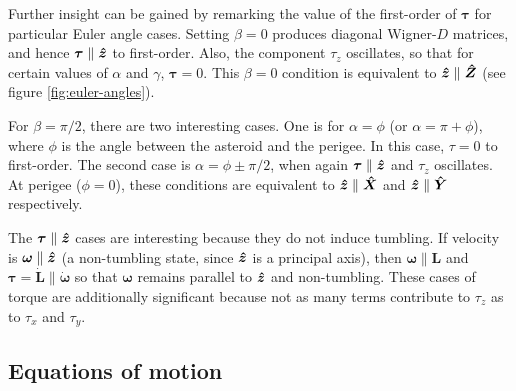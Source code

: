 Further insight can be gained by remarking the value of the first-order of $\bm \tau$ for particular Euler angle cases. Setting $\beta = 0$ produces diagonal Wigner-$D$ matrices, and hence $\bm \tau \parallel \bm{\hat{z}}$ to first-order. Also, the component $\tau_z$ oscillates, so that for certain values of $\alpha$ and $\gamma$, $\bm \tau = 0.$ This $\beta=0$ condition is equivalent to $\bm{\hat{z}} \parallel \bm{\hat{Z}}$ (see figure \ref{fig:euler-angles}).

For $\beta = \pi/2$, there are two interesting cases. One is for $\alpha = \phi$ (or $\alpha = \pi + \phi$), where $\phi$ is the angle between the asteroid and the perigee. In this case, $\tau = 0$ to first-order. The second case is $\alpha = \phi \pm \pi/2$, when again $\bm \tau \parallel \bm{\hat{z}}$ and $\tau_z$ oscillates. At perigee ($\phi=0$), these conditions are equivalent to $\bm{\hat{z}} \parallel \bm{\hat{X}}$ and $\bm{\hat{z}} \parallel \bm{\hat{Y}}$ respectively.

The $\bm \tau \parallel \bm{\hat{z}}$ cases are interesting because they do not induce tumbling. If velocity is $\bm \omega \parallel \bm{\hat{z}}$ (a non-tumbling state, since $\bm{\hat{z}}$ is a principal axis), then $\bm \omega \parallel \bm L$ and $\bm \tau = \dot{\bm L} \parallel \dot{\bm \omega}$ so that $\bm \omega$ remains parallel to $\bm{\hat{z}}$ and non-tumbling. These cases of torque are additionally significant because not as many terms contribute to $\tau_z$ as to $\tau_x$ and $\tau_y$.

\subsection{Equations of motion}
\label{sec:eom}


